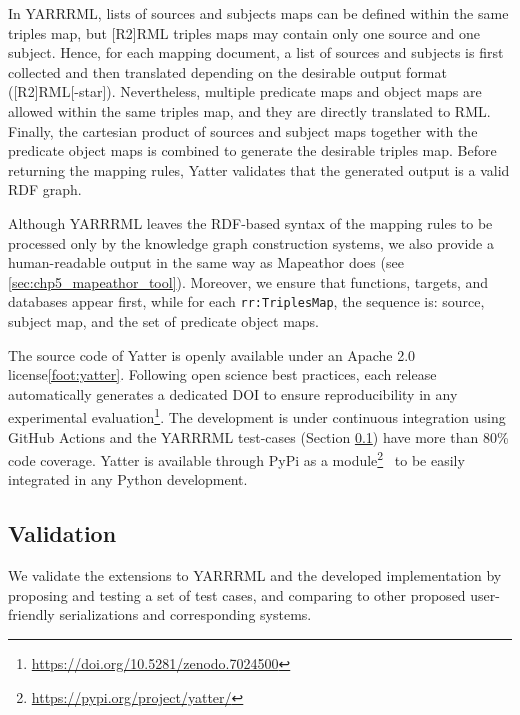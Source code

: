 In YARRRML, lists of sources and subjects maps can be defined within the same triples map, but [R2]RML triples maps may contain only one source and one subject. 
Hence, for each mapping document, a list of sources and subjects is first collected and then translated depending on the desirable output format ([R2]RML[-star]). 
Nevertheless, multiple predicate maps and object maps are allowed within the same triples map, and they are directly translated to RML.
Finally, the cartesian product of sources and subject maps together with the predicate object maps is combined to generate the desirable triples map.
Before returning the mapping rules, Yatter validates that the generated output is a valid RDF graph.



Although YARRRML leaves the RDF-based syntax of the mapping rules to be processed only by the knowledge graph construction systems, we also provide a human-readable output in the same way as Mapeathor does (see \cref{sec:chp5_mapeathor_tool}). 
Moreover, we ensure that functions, targets, and databases appear first, while for each \texttt{rr:TriplesMap}, the sequence is: source, subject map, and the set of predicate object maps.

The source code of Yatter is openly available under an Apache 2.0 license\cref{foot:yatter}.
Following open science best practices, each release automatically generates a dedicated DOI to ensure reproducibility in any experimental evaluation\footnote{\url{https://doi.org/10.5281/zenodo.7024500}}. 
The development is under continuous integration using GitHub Actions and the YARRRML test-cases (Section \ref{sec:chp5_yarrrml-validation}) have more than 80\% code coverage. 
Yatter is available through PyPi as a module\footnote{\url{https://pypi.org/project/yatter/}}~\parencite{david_chaves_2024_yatter} to be easily integrated in any Python development. %



\subsection{Validation}
\label{sec:chp5_yarrrml-validation}
We validate the extensions to YARRRML and the developed implementation by 
proposing and testing a set of test cases, and comparing to other proposed user-friendly serializations and corresponding systems.

